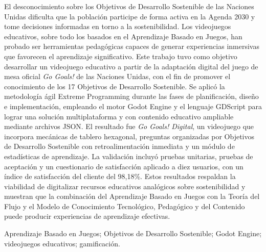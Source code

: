 \documentclass[12pt,a4paper]{article}
\begin{document}
\newpage


\vspace{0.2cm}

El desconocimiento sobre los Objetivos de Desarrollo Sostenible de las Naciones Unidas dificulta que la población participe de forma activa en la Agenda 2030 y tome decisiones informadas en torno a la sostenibilidad. Los videojuegos educativos, sobre todo los basados en el Aprendizaje Basado en Juegos, han probado ser herramientas pedagógicas capaces de generar experiencias inmersivas que favorecen el aprendizaje significativo. Este trabajo tuvo como objetivo desarrollar un videojuego educativo a partir de la adaptación digital del juego de mesa oficial \textit{Go Goals!} de las Naciones Unidas, con el fin de promover el conocimiento de los 17 Objetivos de Desarrollo Sostenible. Se aplicó la metodología ágil Extreme Programming durante las fases de planificación, diseño e implementación, empleando el motor Godot Engine y el lenguaje GDScript para lograr una solución multiplataforma y con contenido educativo ampliable mediante archivos JSON. El resultado fue \textit{Go Goals! Digital}, un videojuego que incorpora mecánicas de tablero hexagonal, preguntas organizadas por Objetivos de Desarrollo Sostenible con retroalimentación inmediata y un módulo de estadísticas de aprendizaje. La validación incluyó pruebas unitarias, pruebas de aceptación y un cuestionario de satisfacción aplicado a diez usuarios, con un índice de satisfacción del cliente del 98,18\%. Estos resultados respaldan la viabilidad de digitalizar recursos educativos analógicos sobre sostenibilidad y muestran que la combinación del Aprendizaje Basado en Juegos con la Teoría del Flujo y el Modelo de Conocimiento Tecnológico, Pedagógico y del Contenido puede producir experiencias de aprendizaje efectivas.

\vspace{0.3cm}

 Aprendizaje Basado en Juegos; Objetivos de Desarrollo Sostenible; Godot Engine; videojuegos educativos; gamificación.

\newpage

\end{document}
